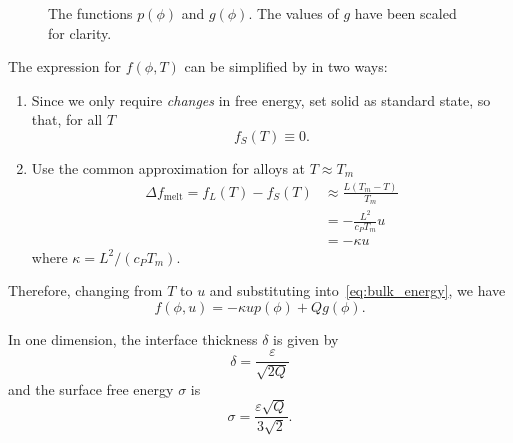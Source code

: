 \documentclass[12pt]{article}
\renewcommand\l{\mathopen{}\left}
\renewcommand\r{\right}
\let\epsilon\varepsilon
\begin{document}
\begin{figure}[htbp]
  \centering
  \begin{minipage}[t]{.7\linewidth}
    \centering
    \caption{The functions $p(\phi)$ and $g(\phi)$. The values of $g$
    have been scaled for clarity.}
    \label{fig:p_and_g}
  \end{minipage}
\end{figure}

The expression for $f(\phi, T)$ can be simplified by in two ways:
\begin{enumerate}
  \item Since we only require \emph{changes} in free energy, set solid
    as standard state, so that, for all $T$
    \begin{equation*}
      f_S(T) \equiv 0.
    \end{equation*}
  \item Use the common approximation for alloys at $T \approx T_m$
    \cite{Porter1992}
    \begin{align*}
      \Delta f_{\text{melt}} = f_L(T) - f_S(T)
      &\approx \frac{L \l( T_m - T \r)}{T_m} \\
      &= - \frac{L^2}{c_P T_m} u \\
      &= - \kappa u
    \end{align*}
    where $\kappa = L^2/ \l( c_P T_m \r)$.
\end{enumerate}
Therefore, changing from $T$ to $u$ and substituting
into~\eqref{eq:bulk_energy}, we have
\begin{equation}
  \label{eq:bulk_energy_solved}
  f(\phi, u) = - \kappa u p(\phi) + Q g(\phi).
\end{equation}

In one dimension, the interface thickness $\delta$ is given by
\begin{equation}
  \label{eq:interface-thickness}
  \delta = \frac{\epsilon}{\sqrt{2 Q}}
\end{equation}
and the surface free energy $\sigma$ is
\begin{equation*}
  \sigma = \frac{\epsilon \sqrt{Q}}{3 \sqrt{2}}.
\end{equation*}
\end{document}
